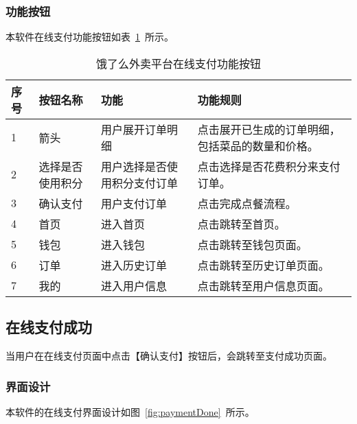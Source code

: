 \subsubsection{功能按钮}
本软件在线支付功能按钮如表~\ref{tab:table6}~所示。
\begin{table}[htbp]
    \caption{饿了么外卖平台在线支付功能按钮}\label{tab:table6}
    \vspace{0.5em}\wuhao
    \begin{tabularx}{\textwidth}{lllX}
    \toprule[1.5pt]
    序号 & 按钮名称 & 功能 & 功能规则 \\ 
    \midrule[1pt]
    1 & 箭头 & 用户展开订单明细 & 点击展开已生成的订单明细，包括菜品的数量和价格。 \\
    2 & 选择是否使用积分 & 用户选择是否使用积分支付订单 & 点击选择是否花费积分来支付订单。 \\
    3 & 确认支付 & 用户支付订单 & 点击完成点餐流程。 \\
    4 & 首页 & 进入首页 & 点击跳转至首页。 \\
    5 & 钱包 & 进入钱包 & 点击跳转至钱包页面。 \\
    6 & 订单 & 进入历史订单 & 点击跳转至历史订单页面。 \\
    7 & 我的 & 进入用户信息 & 点击跳转至用户信息页面。 \\
\bottomrule[1.5pt]
\end{tabularx}
\vspace{\baselineskip}
\end{table}

\subsection{在线支付成功}
当用户在在线支付页面中点击【确认支付】按钮后，会跳转至支付成功页面。
\subsubsection{界面设计}
本软件的在线支付界面设计如图~\ref{fig:paymentDone}~所示。

